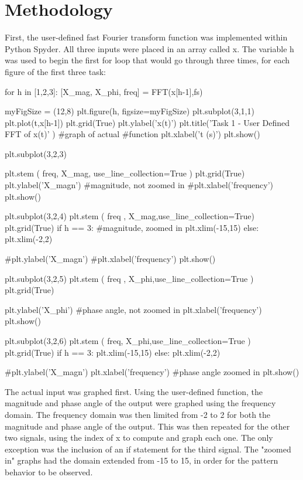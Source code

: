 \documentclass[12pt]{article}
\begin{document}
\section{Methodology}
First, the user-defined fast Fourier transform function was implemented within Python Spyder. All three inputs were placed in an array called x. The variable h was used to begin the first for loop that would go through three times, for each figure of the first three task:
\begin{python}
for h in [1,2,3]:
        [X_mag, X_phi, freq] = FFT(x[h-1],fs)
        
        myFigSize = (12,8)
        plt.figure(h, figsize=myFigSize)    
        plt.subplot(3,1,1)
        plt.plot(t,x[h-1])
        plt.grid(True)
        plt.ylabel('x(t)')
        plt.title('Task 1 - User Defined FFT of x(t)' ) #graph of actual 
        #function
        plt.xlabel('t (s)')    
        plt.show()
        
        plt.subplot(3,2,3)
        
        plt.stem ( freq, X_mag, use_line_collection=True )
        plt.grid(True)
        plt.ylabel('X_magn') #magnitude, not zoomed in
        #plt.xlabel('frequency')    
        plt.show()
        
        plt.subplot(3,2,4)
        plt.stem ( freq , X_mag,use_line_collection=True)
        plt.grid(True)
        if h == 3: #magnitude, zoomed in
            plt.xlim(-15,15)
        else:
            plt.xlim(-2,2)
        
        #plt.ylabel('X_magn')
        #plt.xlabel('frequency')    
        plt.show()
        
        plt.subplot(3,2,5)
        plt.stem ( freq , X_phi,use_line_collection=True )
        plt.grid(True)
        
        plt.ylabel('X_phi') #phase angle, not zoomed in
        plt.xlabel('frequency')    
        plt.show()
        
        plt.subplot(3,2,6)
        plt.stem ( freq, X_phi,use_line_collection=True )
        plt.grid(True)
        if h == 3: 
            plt.xlim(-15,15)
        else:
            plt.xlim(-2,2)
        
        
        #plt.ylabel('X_magn')
        plt.xlabel('frequency')   #phase angle zoomed in 
        plt.show()  
\end{python} 
The actual input was graphed first. Using the user-defined function, the magnitude and phase angle of the output were graphed using the frequency domain. The frequency domain was then limited from -2 to 2 for both the magnitude and phase angle of the output. This was then repeated for the other two signals, using the index of x to compute and graph each one. The only exception was the inclusion of an if statement for the third signal. The "zoomed in" graphs had the domain extended from -15 to 15, in order for the pattern behavior to be observed.
\end{document}
